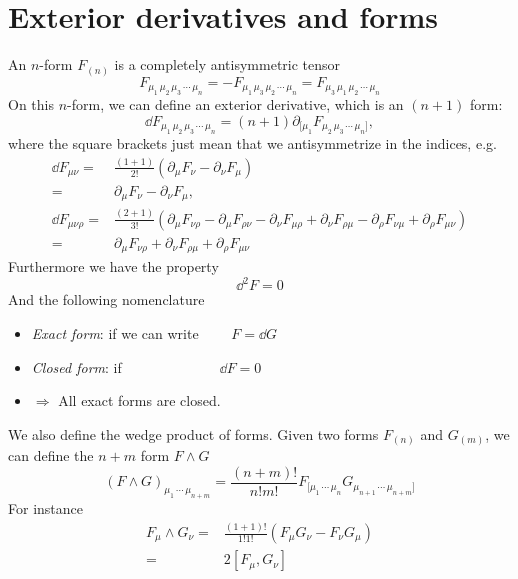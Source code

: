 \documentclass[a4paper,12pt]{article}
\begin{document}
\section{Exterior derivatives and forms}
An $n$-form $F_{(n)}$ is a completely antisymmetric tensor 
\begin{equation}
F_{\mu_1\,\mu_2\,\mu_3\,\cdots\,\mu_n}=-F_{\mu_1\,\mu_3\,\mu_2\,\cdots\,\mu_n}=F_{\mu_3\,\mu_1\,\mu_2\,\cdots\,\mu_n}
\end{equation}
On this $n$-form, we can define an exterior derivative, which is an $(n+1)$ form:
\begin{equation}
\dd F_{\mu_1\,\mu_2\,\mu_3\,\cdots\,\mu_n}=(n+1)\partial_{[\mu_1}F_{\mu_2\,\mu_3\,\cdots\,\mu_n]},
\end{equation}
where the square brackets just mean that we antisymmetrize in the indices, e.g.
\begin{equation}
\begin{aligned}
\dd F_{\mu\nu}=&\frac{(1+1)}{2!}\left(\partial_\mu F_\nu-\partial_\nu F_\mu\right)\\
=&\partial_\mu F_\nu-\partial_\nu F_\mu,\\ \dd F_{\mu\nu\rho}=&\frac{(2+1)}{3!}\left(\partial_\mu F_{\nu\rho}-\partial_\mu F_{\rho\nu}-\partial_\nu F_{\mu\rho}+\partial_\nu F_{\rho\mu}-\partial_\rho F_{\nu\mu}+\partial_\rho F_{\mu\nu}\right)\\
=&\partial_\mu F_{\nu\rho}+\partial_\nu F_{\rho\mu}+\partial_\rho F_{\mu\nu}
\end{aligned}
\end{equation}
Furthermore we have the property
\begin{equation}
\dd^2 F=0
\end{equation}
And the following nomenclature
\begin{itemize}
\item \textit{Exact form}: if we can write $\qquad F=\dd G$
\item \textit{Closed form}: if $\qquad \qquad \qquad ~~~ \dd F=0$
\item $\Rightarrow$ All exact forms are closed.
\end{itemize}
We also define the wedge product of forms. Given two forms $F_{(n)}$ and $G_{(m)}$, we can define the $n+m$ form $F\wedge G$
\begin{equation}
(F\wedge G)_{\mu_1\,\cdots\,\mu_{n+m}}=\frac{(n+m)!}{n!m!}F_{[\mu_1\,\cdots\,\mu_n}G_{\mu_{n+1}\,\cdots\,\mu_{n+m}]}
\end{equation}
For instance
\begin{equation}
\begin{aligned}
F_\mu\wedge G_\nu=&\frac{(1+1)!}{1!1!}\left(F_\mu G_\nu-F_\nu G_\mu\right)\\
=&2[F_\mu,G_\nu]
\end{aligned}
\end{equation}
\end{document}
